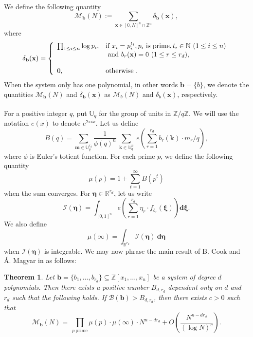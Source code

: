 \documentclass[12pt]{amsart}
\newtheorem{thm}{Theorem}[section]
\theoremstyle{definition}
\theoremstyle{remark}
\numberwithin{equation}{section}
\begin{document}
We define the following quantity
$$
\mathcal{M}_{\mathbf{b}}(N) := \sum_{\mathbf{x} \in [0, N]^n \cap \mathbb{Z}^n} \delta_{\mathbf{b} }(\mathbf{x} ),
$$
where
\begin{eqnarray}
\notag
\delta_{\mathbf{b}} (\mathbf{x} )
=
\left\{
    \begin{array}{ll}
         \prod_{1 \leq i \leq n} \log p_i,
         &\mbox{if } x_i = p_i^{t_i}, p_i \mbox{ is prime}, t_i \in \mathbb{N} \ (1 \leq i \leq n)\\
         & \mbox{ and } b_r(\mathbf{x}) = 0 \ (1 \leq r \leq r_d),
         \\
         & \\
         0,
         &\mbox{otherwise }.
    \end{array}
\right.
\notag
\end{eqnarray}
When the system only has one polynomial, in other words $\mathbf{b} = \{ b \}$, we denote
the quantities $\mathcal{M}_{\mathbf{b}}(N)$ and $\delta_{\mathbf{b}} (\mathbf{x} )$ as $\mathcal{M}_b(N)$ and $\delta_b(\mathbf{x})$, respectively. \\ \\
For a positive integer $q$, put $\mathbb{U}_q$ for the group of units in $\mathbb{Z}/q \mathbb{Z}$. We will use the notation $e(x)$ to denote $e^{2\pi i x}$. Let us define
\begin{equation} \label{BQ}
B( q ) = \sum_{ \mathbf{m} \in \mathbb{U}_q^{r_d}} \frac{1}{\phi(q)^n} \ \sum_{\mathbf{k} \in \mathbb{U}_q^n}\  e\left( \sum_{r=1}^{r_d} {b}_r(\mathbf{k}) \cdot {m_r}/q \right),
\end{equation}
where $\phi$ is Euler's totient function.
For each prime $p$, we define the following quantity
\begin{equation}
\label{def mu p}
\mu(p) =  1  + \sum_{t=1}^{\infty} B( p^t)
\end{equation}
when the sum converges. For $\boldsymbol{\eta} \in \mathbb{R}^{r_d}$, let us write
\begin{equation}
\label{I-eta} \mathcal{I}(\boldsymbol{\eta}) = \int_{[0,1]^n} e \left( \sum_{r=1}^{r_d} \eta_r  \cdot f_{b_r}(\boldsymbol \xi) \right) \mathbf{d} \boldsymbol \xi.
\end{equation}
We also define
$$
\mu(\infty) = \int_{\mathbb{R}^{r_d}} \mathcal{I}( \boldsymbol{\eta}) \ \mathbf{d} \boldsymbol{\eta}
$$
when $\mathcal{I}( \boldsymbol{\eta})$ is integrable.
We may now phrase the main result of B. Cook and \'{A}. Magyar in \cite{CM} as follows:
\begin{thm} \cite[Theorem 1]{CM}
\label{CM theorem}
Let $\mathbf{b} = \{ b_1, ..., b_{r_d} \} \subseteq \mathbb{Z}[x_1,..., x_n]$
be a system of degree $d$ polynomials. 
Then there exists a positive number $B_{d, r_d}$ dependent only on $d$ and $r_d$ such that the following holds. If $ \mathcal{B}(\mathbf{b}) > B_{d, r_d}$, then 
there exists $c>0$ such that
$$
\mathcal{M}_{\mathbf{b} }(N) = \ \prod_{p \ \text{prime}} \mu(p ) \cdot  \mu(\infty ) \cdot N^{n-d r_d} + O\left( \frac{N^{n-d r_d}}{(\log N)^c } \right).
$$
\end{thm}
\end{document}
